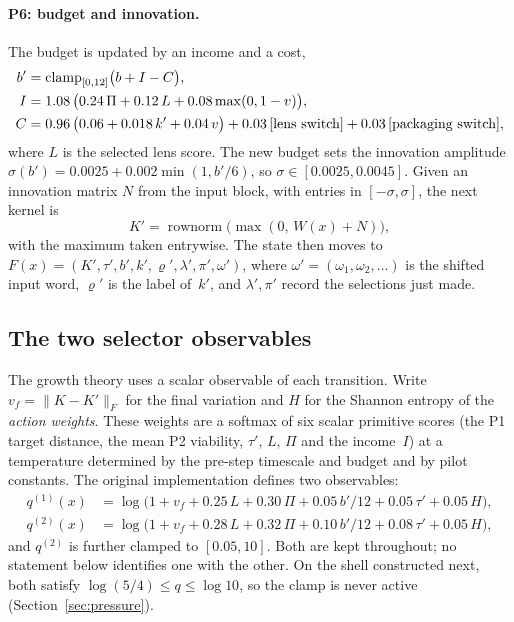 \paragraph{P6: budget and innovation.}
The budget is updated by an income and a cost,
\begin{align*}
b'&=\operatorname{clamp}_{[0,12]}\bigl(b+I-C\bigr),\\
I&=1.08\,\bigl(0.24\,\Pi+0.12\,L+0.08\max(0,1-v)\bigr),\\
C&=0.96\,\bigl(0.06+0.018\,k'+0.04\,v\bigr)+0.03\,[\text{lens switch}]+0.03\,[\text{packaging switch}],
\end{align*}
where $L$ is the selected lens score. The new budget sets the innovation amplitude $\sigma(b')=0.0025+0.002\min(1,b'/6)$, so $\sigma\in[0.0025,0.0045]$. Given an innovation matrix $N$ from the input block, with entries in $[-\sigma,\sigma]$, the next kernel is
\[
K'=\operatorname{rownorm}\bigl(\max(0,\,W(x)+N)\bigr),
\]
with the maximum taken entrywise. The state then moves to $F(x)=(K',\tau',b',k',\varrho',\lambda',\pi',\omega')$, where $\omega'=(\omega_1,\omega_2,\dots)$ is the shifted input word, $\varrho'$ is the label of~$k'$, and $\lambda',\pi'$ record the selections just made.

\subsection{The two selector observables}

The growth theory uses a scalar observable of each transition. Write $v_f=\lVert K-K'\rVert_F$ for the final variation and $H$ for the Shannon entropy of the \emph{action weights}. These weights are a softmax of six scalar primitive scores (the P1 target distance, the mean P2 viability, $\tau'$, $L$, $\Pi$ and the income~$I$) at a temperature determined by the pre-step timescale and budget and by pilot constants. The original implementation defines two observables:
\begin{align*}
q^{(1)}(x)&=\log\bigl(1+v_f+0.25\,L+0.30\,\Pi+0.05\,b'/12+0.05\,\tau'+0.05\,H\bigr),\\
q^{(2)}(x)&=\log\bigl(1+v_f+0.28\,L+0.32\,\Pi+0.10\,b'/12+0.08\,\tau'+0.05\,H\bigr),
\end{align*}
and $q^{(2)}$ is further clamped to $[0.05,10]$. Both are kept throughout; no statement below identifies one with the other. On the shell constructed next, both satisfy $\log(5/4)\le q\le\log 10$, so the clamp is never active (Section~\ref{sec:pressure}).
